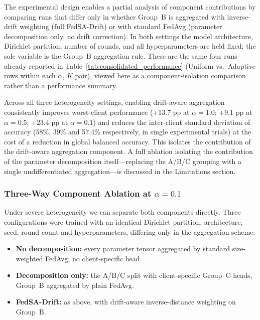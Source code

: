\documentclass{ieeeaccess}
\newcommand{\sadrift}{FedSA-Drift}
\begin{document}
The experimental design enables a partial analysis of component contributions by comparing runs that differ only in whether Group~B is aggregated with inverse-drift weighting (full \sadrift{}) or with standard FedAvg (parameter decomposition only, no drift correction). In both settings the model architecture, Dirichlet partition, number of rounds, and all hyperparameters are held fixed; the sole variable is the Group~B aggregation rule. These are the same four runs already reported in Table~\ref{tab:consolidated_performance} (Uniform vs.\ Adaptive rows within each $\alpha$, $K$ pair), viewed here as a component-isolation comparison rather than a performance summary.

Across all three heterogeneity settings, enabling drift-aware aggregation consistently improves worst-client performance (+13.7 pp at $\alpha{=}1.0$; +9.1 pp at $\alpha{=}0.5$; +23.4 pp at $\alpha{=}0.1$) and reduces the inter-client standard deviation of accuracy (58\%, 39\% and 57.4\% respectively, in single experimental trials) at the cost of a reduction in global balanced accuracy. This isolates the contribution of the drift-aware aggregation component. A full ablation isolating the contribution of the parameter decomposition itself---replacing the A/B/C grouping with a single undifferentiated aggregation---is discussed in the Limitations section.

\subsubsection{Three-Way Component Ablation at $\alpha = 0.1$}
\label{sec:threeway}

Under severe heterogeneity we can separate both components directly. Three configurations were trained with an identical Dirichlet partition, architecture, seed, round count and hyperparameters, differing only in the aggregation scheme:

\begin{itemize}
    \item \textbf{No decomposition:} every parameter tensor aggregated by standard size-weighted FedAvg; no client-specific head.
    \item \textbf{Decomposition only:} the A/B/C split with client-specific Group~C heads, Group~B aggregated by plain FedAvg.
    \item \textbf{\sadrift{}:} as above, with drift-aware inverse-distance weighting on Group~B.
\end{itemize}
\end{document}

